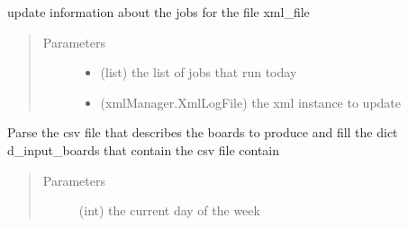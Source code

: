 \documentclass[a4paper,10pt,english]{sphinxmanual}
\begin{document}
\begin{fulllineitems}
\begin{fulllineitems}
\begin{quote}
\begin{description}
\begin{itemize}
\end{itemize}

\end{description}\end{quote}

\end{fulllineitems}


\begin{fulllineitems}
\label{\detokenize{apidoc_commands/commands:commands.jobs.Gui.last_update}}
update information about the jobs for the file xml\_file
\begin{quote}\begin{description}
\item[{Parameters}] \leavevmode\begin{itemize}
\item {} 
 \textendash{} (list) the list of jobs that run today

\item {} 
 \textendash{} (xmlManager.XmlLogFile) the xml instance to update

\end{itemize}

\end{description}\end{quote}

\end{fulllineitems}


\begin{fulllineitems}
\label{\detokenize{apidoc_commands/commands:commands.jobs.Gui.parse_csv_boards}}
Parse the csv file that describes the boards to produce and fill 
the dict d\_input\_boards that contain the csv file contain
\begin{quote}\begin{description}
\item[{Parameters}] \leavevmode
{} \textendash{} (int) the current day of the week

\end{description}\end{quote}


\end{fulllineitems}
\end{fulllineitems}
\end{document}
